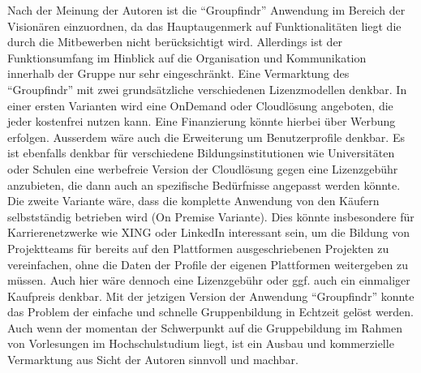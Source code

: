 Nach der Meinung der Autoren ist die "`Groupfindr"' Anwendung im Bereich der Visionären einzuordnen, da das Hauptaugenmerk auf Funktionalitäten liegt die durch die Mitbewerben nicht berücksichtigt wird. Allerdings ist der Funktionsumfang im Hinblick auf die Organisation und Kommunikation innerhalb der Gruppe nur sehr eingeschränkt.
\newline\newline
Eine Vermarktung des "`Groupfindr"' mit zwei grundsätzliche verschiedenen Lizenzmodellen denkbar. In einer ersten Varianten wird eine OnDemand oder Cloudlösung angeboten, die jeder kostenfrei nutzen kann. Eine Finanzierung könnte hierbei über Werbung erfolgen. Ausserdem wäre auch die Erweiterung um Benutzerprofile denkbar. Es ist ebenfalls denkbar für verschiedene Bildungsinstitutionen wie Universitäten oder Schulen eine werbefreie Version der Cloudlösung gegen eine Lizenzgebühr anzubieten, die dann auch an spezifische Bedürfnisse angepasst werden könnte. Die zweite Variante wäre, dass die komplette Anwendung von den Käufern selbstständig betrieben wird (On Premise Variante). Dies könnte insbesondere für Karrierenetzwerke wie XING oder LinkedIn interessant sein, um die Bildung von Projektteams für bereits auf den Plattformen ausgeschriebenen Projekten zu vereinfachen, ohne die Daten der Profile der eigenen Plattformen weitergeben zu müssen. Auch hier wäre dennoch eine Lizenzgebühr oder ggf. auch ein einmaliger Kaufpreis denkbar.
\newline\newline
Mit der jetzigen Version der Anwendung "`Groupfindr"' konnte das Problem der einfache und schnelle Gruppenbildung in Echtzeit gelöst werden. Auch wenn der momentan der Schwerpunkt auf die Gruppebildung im Rahmen von Vorlesungen im Hochschulstudium liegt, ist ein Ausbau und kommerzielle Vermarktung aus Sicht der Autoren sinnvoll und machbar.
